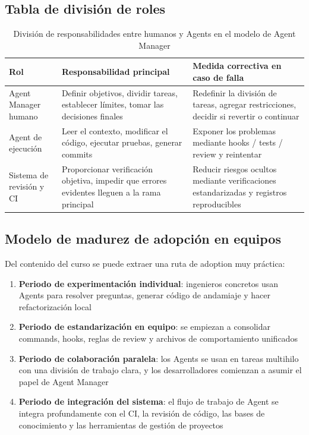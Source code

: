 \subsection{Tabla de división de roles}

\begin{table}[H]
\centering
\begin{tabular}{p{} p{} p{}}
\toprule
Rol & Responsabilidad principal & Medida correctiva en caso de falla \\
\midrule
Agent Manager humano & Definir objetivos, dividir tareas, establecer límites, tomar las decisiones finales & Redefinir la división de tareas, agregar restricciones, decidir si revertir o continuar \\
Agent de ejecución & Leer el contexto, modificar el código, ejecutar pruebas, generar commits & Exponer los problemas mediante hooks / tests / review y reintentar \\
Sistema de revisión y CI & Proporcionar verificación objetiva, impedir que errores evidentes lleguen a la rama principal & Reducir riesgos ocultos mediante verificaciones estandarizadas y registros reproducibles \\
\bottomrule
\end{tabular}
\caption{División de responsabilidades entre humanos y Agents en el modelo de Agent Manager}
\end{table}

\subsection{Modelo de madurez de adopción en equipos}

Del contenido del curso se puede extraer una ruta de adoption muy práctica:

\begin{enumerate}
    \item \textbf{Periodo de experimentación individual}: ingenieros concretos usan Agents para resolver preguntas, generar código de andamiaje y hacer refactorización local
    \item \textbf{Periodo de estandarización en equipo}: se empiezan a consolidar commands, hooks, reglas de review y archivos de comportamiento unificados
    \item \textbf{Periodo de colaboración paralela}: los Agents se usan en tareas multihilo con una división de trabajo clara, y los desarrolladores comienzan a asumir el papel de Agent Manager
    \item \textbf{Periodo de integración del sistema}: el flujo de trabajo de Agent se integra profundamente con el CI, la revisión de código, las bases de conocimiento y las herramientas de gestión de proyectos
\end{enumerate}

